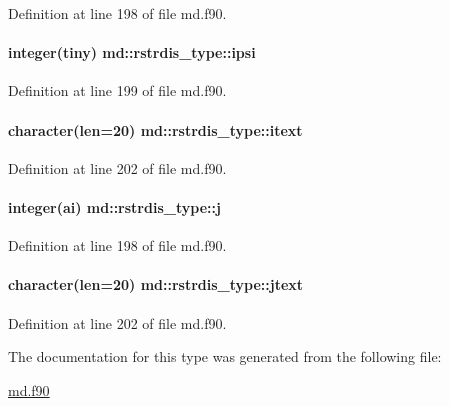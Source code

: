 Definition at line 198 of file md.\-f90.

\hypertarget{structmd_1_1rstrdis__type_ad5d682c9991a21ce85aac745c2e0eb3e}{
\paragraph[{ipsi}]{\setlength{\rightskip}{0pt plus 5cm}integer(tiny) md\-::rstrdis\-\_\-type\-::ipsi}}\label{structmd_1_1rstrdis__type_ad5d682c9991a21ce85aac745c2e0eb3e}


Definition at line 199 of file md.\-f90.

\hypertarget{structmd_1_1rstrdis__type_a06221ecb25e85a39ebf448493be29936}{
\paragraph[{itext}]{\setlength{\rightskip}{0pt plus 5cm}character(len=20) md\-::rstrdis\-\_\-type\-::itext}}\label{structmd_1_1rstrdis__type_a06221ecb25e85a39ebf448493be29936}


Definition at line 202 of file md.\-f90.

\hypertarget{structmd_1_1rstrdis__type_a7af40a377e61cf855aba1497c4755f4d}{
\paragraph[{j}]{\setlength{\rightskip}{0pt plus 5cm}integer(ai) md\-::rstrdis\-\_\-type\-::j}}\label{structmd_1_1rstrdis__type_a7af40a377e61cf855aba1497c4755f4d}


Definition at line 198 of file md.\-f90.

\hypertarget{structmd_1_1rstrdis__type_a623e91abc941db4679c4b3274db915f4}{
\paragraph[{jtext}]{\setlength{\rightskip}{0pt plus 5cm}character(len=20) md\-::rstrdis\-\_\-type\-::jtext}}\label{structmd_1_1rstrdis__type_a623e91abc941db4679c4b3274db915f4}


Definition at line 202 of file md.\-f90.



The documentation for this type was generated from the following file\-:\begin{DoxyCompactItemize}
\item 
\hyperlink{md_8f90}{md.\-f90}\end{DoxyCompactItemize}
